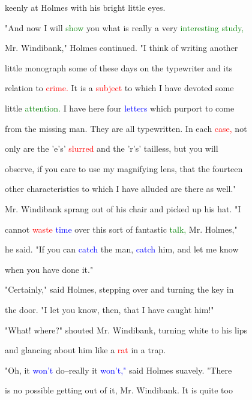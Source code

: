  keenly at Holmes with his bright little eyes.



 "And now I will \textcolor{green}{show} you what is really a very \textcolor{green}{interesting} \textcolor{green}{study,}

 Mr. Windibank," Holmes continued. "I think of writing another

 little monograph some of these days on the typewriter and its

 relation to \textcolor{red}{crime.} It is a \textcolor{red}{subject} to which I have devoted some

 little \textcolor{green}{attention.} I have here four \textcolor{blue}{letters} which purport to come

 from the missing man. They are all typewritten. In each \textcolor{red}{case,} not

 only are the 'e's' \textcolor{red}{slurred} and the 'r's' tailless, but you will

 observe, if you care to use my magnifying lens, that the fourteen

 other characteristics to which I have alluded are there as well."



 Mr. Windibank sprang out of his chair and picked up his hat. "I

 cannot \textcolor{red}{waste} \textcolor{blue}{time} over this sort of fantastic \textcolor{green}{talk,} Mr. Holmes,"

 he said. "If you can \textcolor{blue}{catch} the man, \textcolor{blue}{catch} him, and let me know

 when you have done it."



 "Certainly," said Holmes, stepping over and turning the key in

 the door. "I let you know, then, that I have caught him!"



 "What! where?" \textcolor{BurntOrange}{shouted} Mr. Windibank, turning \textcolor{BurntOrange}{white} to his lips

 and glancing about him like a \textcolor{red}{rat} in a trap.



 "Oh, it \textcolor{blue}{won't} do--really it \textcolor{blue}{won't,"} said Holmes suavely. "There

 is no possible getting out of it, Mr. Windibank. It is quite too

